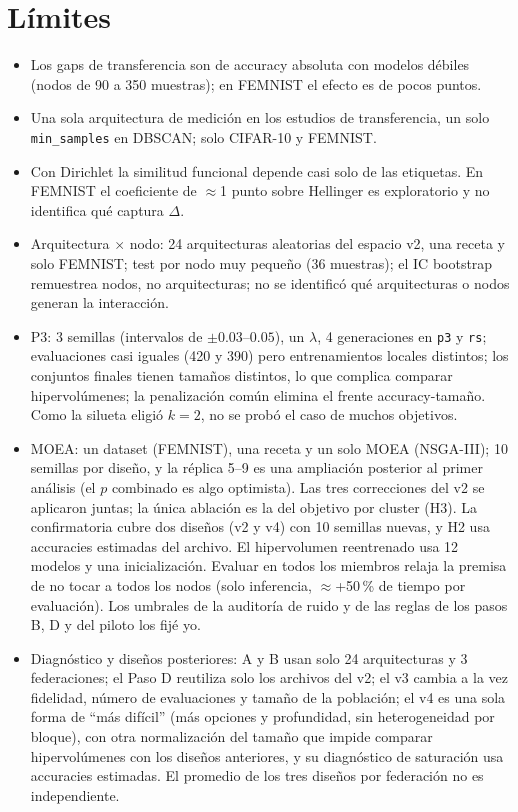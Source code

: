 \documentclass[11pt,a4paper]{article}
\begin{document}
\section{Límites}
\begin{itemize}[leftmargin=*,itemsep=2pt]
\item Los gaps de transferencia son de accuracy absoluta con modelos débiles (nodos de 90 a 350 muestras); en FEMNIST el efecto es de pocos puntos.
\item Una sola arquitectura de medición en los estudios de transferencia, un solo \texttt{min\_samples} en DBSCAN; solo CIFAR-10 y FEMNIST.
\item Con Dirichlet la similitud funcional depende casi solo de las etiquetas. En FEMNIST el coeficiente de $\approx$1 punto sobre Hellinger es exploratorio y no identifica qué captura $\Delta$.
\item Arquitectura $\times$ nodo: 24 arquitecturas aleatorias del espacio v2, una receta y solo FEMNIST; test por nodo muy pequeño (36 muestras); el IC bootstrap remuestrea nodos, no arquitecturas; no se identificó qué arquitecturas o nodos generan la interacción.
\item P3: 3 semillas (intervalos de $\pm0.03$--$0.05$), un $\lambda$, 4 generaciones en \texttt{p3} y \texttt{rs}; evaluaciones casi iguales (420 y 390) pero entrenamientos locales distintos; los conjuntos finales tienen tamaños distintos, lo que complica comparar hipervolúmenes; la penalización común elimina el frente accuracy-tamaño. Como la silueta eligió $k=2$, no se probó el caso de muchos objetivos.
\item MOEA: un dataset (FEMNIST), una receta y un solo MOEA (NSGA-III); 10 semillas por diseño, y la réplica 5--9 es una ampliación posterior al primer análisis (el $p$ combinado es algo optimista). Las tres correcciones del v2 se aplicaron juntas; la única ablación es la del objetivo por cluster (H3). La confirmatoria cubre dos diseños (v2 y v4) con 10 semillas nuevas, y H2 usa accuracies estimadas del archivo. El hipervolumen reentrenado usa 12 modelos y una inicialización. Evaluar en todos los miembros relaja la premisa de no tocar a todos los nodos (solo inferencia, $\approx$+50\,\% de tiempo por evaluación). Los umbrales de la auditoría de ruido y de las reglas de los pasos B, D y del piloto los fijé yo.
\item Diagnóstico y diseños posteriores: A y B usan solo 24 arquitecturas y 3 federaciones; el Paso D reutiliza solo los archivos del v2; el v3 cambia a la vez fidelidad, número de evaluaciones y tamaño de la población; el v4 es una sola forma de ``más difícil'' (más opciones y profundidad, sin heterogeneidad por bloque), con otra normalización del tamaño que impide comparar hipervolúmenes con los diseños anteriores, y su diagnóstico de saturación usa accuracies estimadas. El promedio de los tres diseños por federación no es independiente.
\end{itemize}
\end{document}
